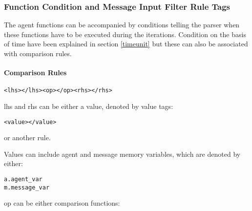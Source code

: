 \subsubsection{Function Condition and Message Input Filter Rule
Tags}\label{functioncond}

The agent functions can be accompanied by conditions telling the
parser when these functions have to be executed during the
iterations. Condition on the basis of time have been explained in
section \ref{timeunit} but these can also be associated with
comparison rules.

\paragraph{Comparison Rules}

\begin{mylisting}
\begin{verbatim}
<lhs></lhs><op></op><rhs></rhs>
\end{verbatim}
\end{mylisting}

lhs and rhs can be either a value, denoted by value tags:

\begin{mylisting}
\begin{verbatim}
<value></value>
\end{verbatim}
\end{mylisting}

or another rule.

Values can include agent and message memory variables, which are denoted by either:

\begin{mylisting}
\begin{verbatim}
a.agent_var
m.message_var
\end{verbatim}
\end{mylisting}

op can be either comparison functions:


